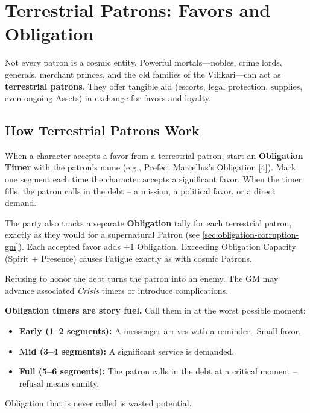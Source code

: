 \section{Terrestrial Patrons: Favors and Obligation}
\label{sec:terrestrial-patrons-gm}

Not every patron is a cosmic entity. Powerful mortals---nobles, crime lords, generals, merchant princes, and the old families of the Vilikari---can act as \textbf{terrestrial patrons}. They offer tangible aid (escorts, legal protection, supplies, even ongoing Assets) in exchange for favors and loyalty.

\subsection{How Terrestrial Patrons Work}

When a character accepts a favor from a terrestrial patron, start an \textbf{Obligation Timer } with the patron's name (e.g., \textquotedbl Prefect Marcellus's Obligation [4]\textquotedbl). Mark one segment each time the character accepts a significant favor. When the timer fills, the patron calls in the debt -- a mission, a political favor, or a direct demand.

The party also tracks a separate \textbf{Obligation} tally for each terrestrial patron, exactly as they would for a supernatural Patron (see \ref{sec:obligation-corruption-gm}). Each accepted favor adds +1 Obligation. Exceeding Obligation Capacity (Spirit + Presence) causes Fatigue exactly as with cosmic Patrons.

Refusing to honor the debt turns the patron into an enemy. The GM may advance associated \textit{Crisis} timers or introduce complications.

\begin{tcolorbox}[colback=gray!5!white,colframe=gray!75!black,title={Use Obligation Timers Aggressively},breakable]
\textbf{Obligation timers are story fuel.} Call them in at the worst possible moment:
\begin{itemize}
  \item \textbf{Early (1--2 segments):} A messenger arrives with a \textquotedbl reminder.\textquotedbl\ Small favor.
  \item \textbf{Mid (3--4 segments):} A significant service is demanded.
  \item \textbf{Full (5--6 segments):} The patron calls in the debt at a critical moment -- refusal means enmity.
\end{itemize}
Obligation that is never called is wasted potential.
\end{tcolorbox}

